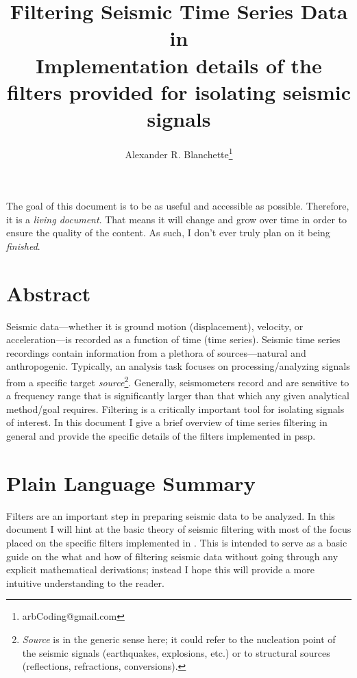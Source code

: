 \documentclass[american, twoside]{article}
\title{\Huge Filtering Seismic Time Series Data in \glsxtrfull{pssp}\\
\large Implementation details of the filters provided for isolating seismic signals}
\author{Alexander R. Blanchette\thanks{arbCoding@gmail.com}}
\date{\Today}
\begin{document}
\maketitle
\pagestyle{fancy}
\scriptsize The goal of this document is to be as useful and accessible as possible. Therefore, it is a \textit{living document}. That means
it will change and grow over time in order to ensure the quality of the content. As such, I don't ever truly plan on it being
\textit{finished}.
\normalsize

\begin{tcolorbox}[enhanced]
    \section*{Abstract} \label{Abstract}
    Seismic data---whether it is ground motion (displacement), velocity, or acceleration---is recorded as a function of time (time series). Seismic time series
    recordings contain information from a plethora of sources---natural and anthropogenic. Typically, an analysis task focuses on processing/analyzing
    signals from a specific target \textit{source}\footnote{\textit{Source} is in the generic sense here; it could refer to the nucleation point of the seismic
    signals (earthquakes, explosions, etc.) or to structural sources (reflections, refractions, conversions).}. Generally, seismometers record and are sensitive
    to a \gls{frequency} range that is significantly larger than that which any given analytical method/goal requires. Filtering is a critically important tool for
    isolating signals of interest. In this document I give a brief overview of time series filtering in general and provide the specific details of the filters
    implemented in \gls{pssp}.
    \section*{Plain Language Summary} \label{PlainSummary}
    Filters are an important step in preparing seismic data to be analyzed. In this document I will hint at the basic theory of seismic filtering
    with most of the focus placed on the specific filters implemented in . This is intended to serve as a basic guide on the what and how of filtering seismic data without going through
    any explicit mathematical derivations; instead I hope this will provide a more intuitive understanding to the reader.
\end{tcolorbox}
\end{document}
